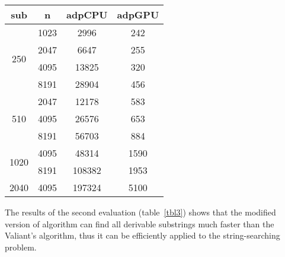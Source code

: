 \begin{table*}

\begin{center}
\caption{Modified algorithm evaluation on the string-searching for the $BIO$ grammar}
\label{tbl3}
    \begin{tabular}{ ||c||c||c|c|| } 
    \hline 
     sub & n & adpCPU &  adpGPU \\
    \hline
    \multirow{4}{1.5em}{250} & 1023 & 2996 & 242 \\ 
    & 2047 & 6647 & 255\\ 
    & 4095 & 13825 & 320\\ 
    & 8191 & 28904 & 456\\ 
    \hline
    \multirow{3}{1.5em}{510} & 2047 & 12178 & 583\\
    & 4095 & 26576 & 653\\
    & 8191 & 56703 & 884\\ 
    \hline
    \multirow{2}{2em}{1020} & 4095 & 48314 & 1590 \\
    & 8191 & 108382 & 1953\\ 
    \hline
    2040 & 4095 & 197324 & 5100\\ 
    \hline
    \end{tabular}
\end{center}

\end{table*}

The results of the second evaluation (table~\ref{tbl3}) shows that the modified version of algorithm can find all derivable substrings much faster than the Valiant's algorithm, thus it can be efficiently applied to the string-searching problem.